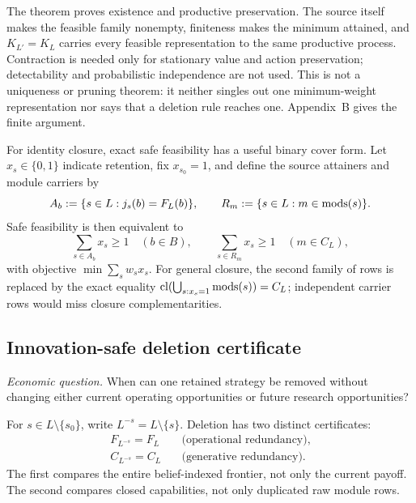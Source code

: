 The theorem proves existence and productive preservation.  The source itself
makes the feasible family nonempty, finiteness makes the minimum attained, and
\(K_{L'}=K_L\) carries every feasible representation to the same productive
process.  Contraction is needed only for stationary value and action
preservation; detectability and probabilistic independence are not used.
This is not a uniqueness or pruning theorem: it neither singles out one
minimum-weight representation nor says that a deletion rule reaches one.
Appendix~B gives the finite argument.

For identity closure, exact safe feasibility has a useful binary cover form.
Let
\(x_s\in\{0,1\}\) indicate retention, fix \(x_{s_0}=1\), and define the source
attainers and module carriers by
\[
 A_b:=\{s\in L:j_s(b)=F_L(b)\},\qquad
 R_m:=\{s\in L:m\in\operatorname{mods}(s)\}.
\]
Safe feasibility is then equivalent to
\begin{equation}\label{eq:identity-safe-cover}
 \sum_{s\in A_b}x_s\ge1\quad(b\in B),\qquad
 \sum_{s\in R_m}x_s\ge1\quad(m\in C_L),
\end{equation}
with objective \(\min\sum_sw_sx_s\).  For general closure, the second family
of rows is replaced by the exact equality
\(\operatorname{cl}(\bigcup_{s:x_s=1}\operatorname{mods}(s))=C_L\); independent carrier rows would miss
closure complementarities.

\subsection{Innovation-safe deletion certificate}

\emph{Economic question.}  When can one retained strategy be removed without
changing either current operating opportunities or future research
opportunities?

\begin{definition}
\label{def:deletion-redundancy}
For \(s\in L\setminus\{s_0\}\), write \(L^{-s}=L\setminus\{s\}\).  Deletion
has two distinct certificates:
\begin{align}
 F_{L^{-s}}=F_L
   &\quad\text{(operational redundancy)},
   \label{eq:operational-redundancy}\\
 C_{L^{-s}}=C_L
   &\quad\text{(generative redundancy)}.
   \label{eq:generative-redundancy}
\end{align}
The first compares the entire belief-indexed frontier, not only the current
payoff.  The second compares closed capabilities, not only duplicated raw
module rows.
\end{definition}

